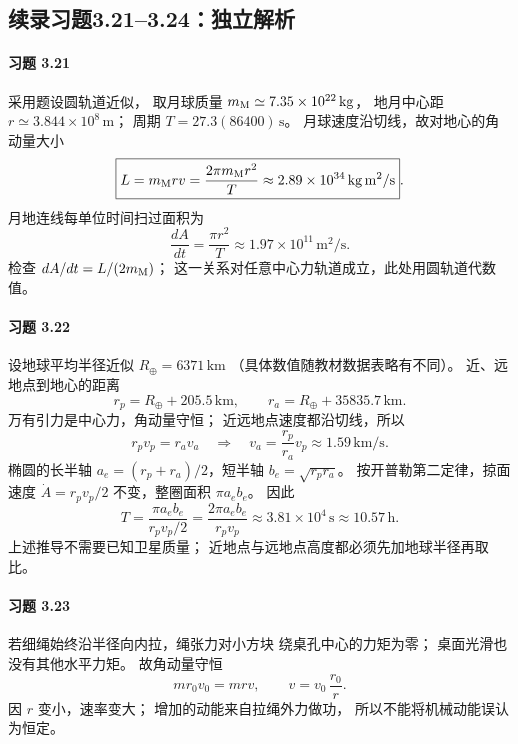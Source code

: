 \subsection*{续录习题3.21--3.24：独立解析}

\paragraph{习题 3.21}
采用题设圆轨道近似，
取月球质量 \(m_{\rm M}\simeq7.35\times10^{22}\,\mathrm{kg}\)，
地月中心距 \(r\simeq3.844\times10^8\,\mathrm m\)；
周期 \(T=27.3(86400)\,\mathrm s\)。
月球速度沿切线，故对地心的角动量大小
\[
 \boxed{L=m_{\rm M}rv
 =\frac{2\pi m_{\rm M}r^2}{T}
 \approx2.89\times10^{34}\,\mathrm{kg\,m^2/s}}.
\]
月地连线每单位时间扫过面积为
\[
 \boxed{\frac{dA}{dt}=\frac{\pi r^2}{T}
 \approx1.97\times10^{11}\,\mathrm{m^2/s}}.
\]
检查 \(dA/dt=L/(2m_{\rm M})\)；
这一关系对任意中心力轨道成立，此处用圆轨道代数值。

\paragraph{习题 3.22}
设地球平均半径近似 \(R_\oplus=6371\,\mathrm{km}\)
（具体数值随教材数据表略有不同）。
近、远地点到地心的距离
\[
 r_p=R_\oplus+205.5\,\mathrm{km},\qquad
 r_a=R_\oplus+35835.7\,\mathrm{km}.
\]
万有引力是中心力，角动量守恒；
近远地点速度都沿切线，所以
\[
 r_pv_p=r_av_a
 \quad\Rightarrow\quad
 \boxed{v_a=\frac{r_p}{r_a}v_p
 \approx1.59\,\mathrm{km/s}}.
\]
椭圆的长半轴
\(a_e=(r_p+r_a)/2\)，短半轴
\(b_e=\sqrt{r_pr_a}\)。
按开普勒第二定律，掠面速度
\(\dot A=r_pv_p/2\) 不变，整圈面积
\(\pi a_eb_e\)。
因此
\[
 \boxed{T=\frac{\pi a_eb_e}{r_pv_p/2}
 =\frac{2\pi a_eb_e}{r_pv_p}
 \approx3.81\times10^4\,\mathrm s
 \approx10.57\,\mathrm h}.
\]
上述推导不需要已知卫星质量；
近地点与远地点高度都必须先加地球半径再取比。

\paragraph{习题 3.23}
若细绳始终沿半径向内拉，绳张力对小方块
绕桌孔中心的力矩为零；
桌面光滑也没有其他水平力矩。
故角动量守恒
\[
 m r_0v_0=mrv,\qquad
 \boxed{v=v_0\,\frac{r_0}{r}}.
\]
因 \(r\) 变小，速率变大；
增加的动能来自拉绳外力做功，
所以不能将机械动能误认为恒定。

